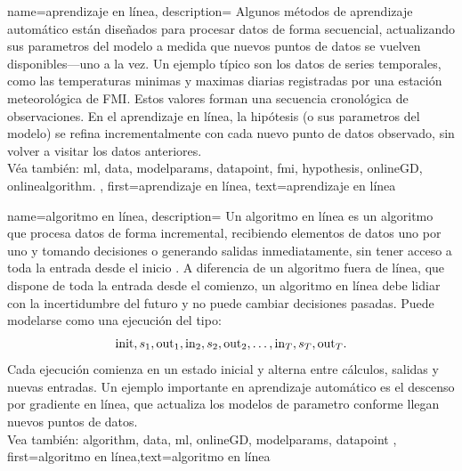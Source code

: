 {name={aprendizaje en línea},
	description={
		Algunos métodos de aprendizaje automático  están diseñados para procesar 
		datos de forma secuencial, actualizando sus parametros del modelo a medida que nuevos 
		puntos de datos se vuelven disponibles—uno a la vez. Un ejemplo típico son los datos de 
		series temporales, como las temperaturas minimas y maximas diarias registradas 
		por una estación meteorológica de FMI. Estos valores forman una secuencia cronológica 
		de observaciones. En el aprendizaje en línea, la hipótesis (o sus parametros del modelo) 
		se refina incrementalmente con cada nuevo punto de datos observado, sin volver a visitar 
		los datos anteriores.\\ 
		Véa también: \gls{ml}, \gls{data}, \glspl{modelparam}, \gls{datapoint}, \gls{fmi}, \gls{hypothesis}, \gls{onlineGD}, \gls{onlinealgorithm}.
	},
	first={aprendizaje en línea},
	text={aprendizaje en línea}
}

{name=algoritmo en línea,
	description={
		Un algoritmo en línea es un algoritmo que procesa datos de forma incremental,
		recibiendo elementos de datos uno por uno y tomando decisiones o generando salidas inmediatamente, sin tener acceso a toda la entrada desde el inicio \cite{HazanOCO,PredictionLearningGames}.
		A diferencia de un algoritmo fuera de línea, que dispone de toda la entrada desde el comienzo, un algoritmo en línea debe lidiar con la incertidumbre del futuro y no puede cambiar decisiones pasadas.
		Puede modelarse como una ejecución del tipo:
		$${\rm init},s_1,{\rm out}_{1},{\rm in}_{2},s_2,{\rm out}_{2},\ldots,{\rm in}_{T},s_T,{\rm out}_{T}.$$
		Cada ejecución comienza en un estado inicial y alterna entre cálculos, salidas y nuevas entradas.
		Un ejemplo importante en aprendizaje automático es el descenso por gradiente en línea, que actualiza los modelos de parametro conforme llegan nuevos puntos de datos.
		\\
		Vea también: \gls{algorithm}, \gls{data}, \gls{ml}, \gls{onlineGD}, \glspl{modelparam}, \gls{datapoint} },
	first={algoritmo en línea},text={algoritmo en línea}
}



